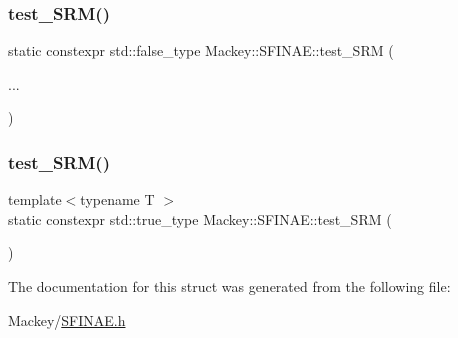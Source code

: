 \subsubsection{\texorpdfstring{test\+\_\+\+S\+R\+M()}{test\_SRM()}\hspace{0.1cm}{\footnotesize\ttfamily [1/2]}}
{\footnotesize\ttfamily static constexpr std\+::false\+\_\+type Mackey\+::\+S\+F\+I\+N\+A\+E\+::test\+\_\+\+S\+RM (\begin{DoxyParamCaption}\item[{}]{... }\end{DoxyParamCaption})\hspace{0.3cm}{\ttfamily [static]}}

\mbox{\label{structMackey_1_1SFINAE_ad1aecc9a9a8af9287b17695cbfe1bffb}} 
\subsubsection{\texorpdfstring{test\+\_\+\+S\+R\+M()}{test\_SRM()}\hspace{0.1cm}{\footnotesize\ttfamily [2/2]}}
{\footnotesize\ttfamily template$<$typename T $>$ \\
static constexpr std\+::true\+\_\+type Mackey\+::\+S\+F\+I\+N\+A\+E\+::test\+\_\+\+S\+RM (\begin{DoxyParamCaption}\item[{Eigen\+::\+Sparse\+Matrix$<$ T, 1 $>$}]{ }\end{DoxyParamCaption})\hspace{0.3cm}{\ttfamily [static]}}



The documentation for this struct was generated from the following file\+:\begin{DoxyCompactItemize}
\item 
Mackey/\hyperlink{SFINAE_8h}{S\+F\+I\+N\+A\+E.\+h}\end{DoxyCompactItemize}
